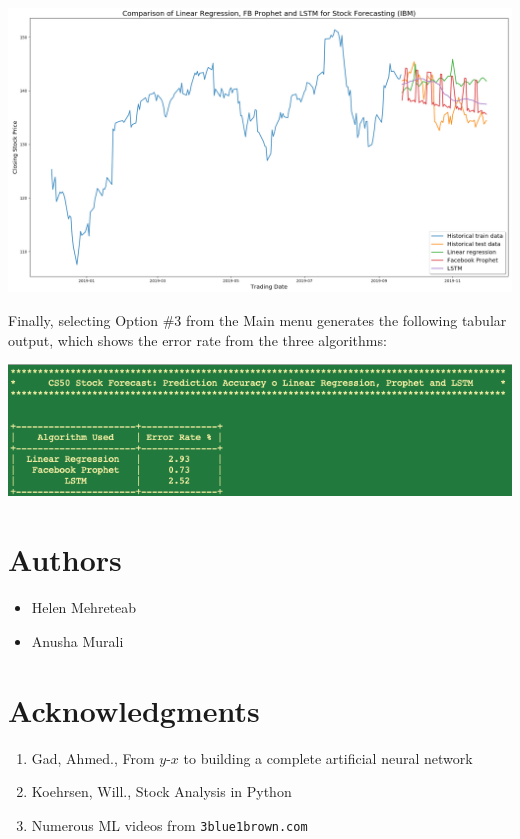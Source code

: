 \documentclass[12pt, oneside]{article}   	%
\begin{document}
\centerline{\includegraphics[width=6in]{ALL.png}}

\vspace*{0.2in}
\noindent
Finally, selecting Option \#3 from the Main menu generates the following tabular output, which shows the error rate from the three algorithms:\\

\centerline{\includegraphics[width=6.5in]{4.png}}


\section{Authors}
\begin{itemize}
\item Helen Mehreteab 
\item Anusha Murali
\end{itemize}


\section{Acknowledgments}

\begin{enumerate}
\item Gad, Ahmed., From $y$-$x$ to building a complete artificial neural network
\item Koehrsen, Will., Stock Analysis in Python
\item Numerous ML videos from {\tt 3blue1brown.com}
\end{enumerate}
\end{document}
